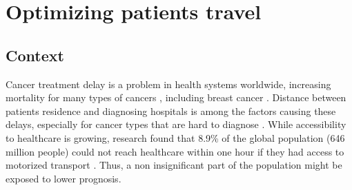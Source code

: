 \chapter{Optimizing patients travel}

\section{Context}

Cancer treatment delay is a problem in health systems worldwide, increasing
mortality for many types of cancers \cite{hanna_mortality_2020}, including
breast cancer \cite{caplan_delay_1992, williams_assessment_2015,
    pace_delays_2015}. Distance between patients residence and diagnosing hospitals
is among the factors causing these delays, especially for cancer types that are
hard to diagnose \cite{flytkjaer_virgilsen_cancer_2019}. While accessibility to
healthcare is growing, research found that 8.9\% of the global population (646
million people) could not reach healthcare within one hour if they had access to
motorized transport \cite{weiss_global_2020}. Thus, a non insignificant part of
the population might be exposed to lower prognosis.

